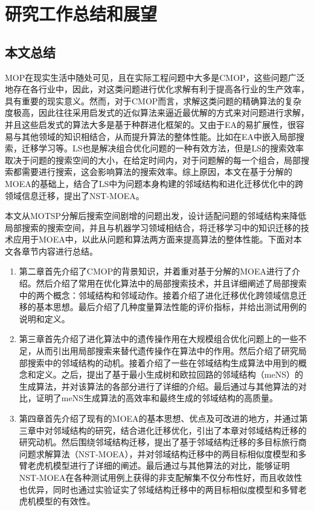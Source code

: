 \chapter{研究工作总结和展望}
\label{chap:conclusion}
\section{本文总结}
\label{sec:conclusion}
MOP在现实生活中随处可见，且在实际工程问题中大多是CMOP，这些问题广泛地存在各行业中，因此，对这类问题进行优化求解有利于提高各行业的生产效率，具有重要的现实意义。然而，对于CMOP而言，求解这类问题的精确算法的复杂度极高，因此往往采用启发式的近似算法来逼近最优解的方式来对问题进行求解，并且这些启发式的算法大多是基于种群进化框架的。又由于EA的易扩展性，很容易与其他领域的知识相结合，从而提升算法的整体性能。比如在EA中嵌入局部搜索，迁移学习等。LS也是解决组合优化问题的一种有效方法，但是LS的搜索效率取决于问题的搜索空间的大小，在给定时间内，对于问题解的每一个组合，局部搜索都需要进行搜索，这会影响算法的搜索效率。综上原因，本文在基于分解的MOEA的基础上，结合了LS中为问题本身构建的邻域结构和进化迁移优化中的跨领域信息迁移，提出了NST-MOEA。
\par
本文从MOTSP分解后搜索空间剧增的问题出发，设计适配问题的邻域结构来降低局部搜索的搜索空间，并且与机器学习领域相结合，将迁移学习中的知识迁移的技术应用于MOEA中，以此从问题和算法两方面来提高算法的整体性能。下面对本文各章节内容进行总结。
\begin{enumerate}
    \item 第二章首先介绍了CMOP的背景知识，并着重对基于分解的MOEA进行了介绍。然后介绍了常用在优化算法中的局部搜索技术，并且详细阐述了局部搜索中的两个概念：邻域结构和邻域动作。接着介绍了进化迁移优化跨领域信息迁移的基本思想。最后介绍了几种度量算法性能的评价指标，并给出测试用例的说明和定义。
    \item 第三章首先介绍了进化算法中的遗传操作用在大规模组合优化问题上的一些不足，从而引出用局部搜索来替代遗传操作在算法中的作用。然后介绍了研究局部搜索中的邻域结构的动机。接着介绍了一些在邻域结构生成算法中用到的概念和定义。之后，提出了基于最小生成树和欧拉回路的邻域结构（meNS）的生成算法，并对该算法的各部分进行了详细的介绍。最后通过与其他算法的对比，证明了meNS生成算法的高效率和最终生成的邻域结构的高质量。
    \item 第四章首先介绍了现有的MOEA的基本思想、优点及可改进的地方，并通过第三章中对邻域结构的研究，结合进化迁移优化，引出了本章对邻域结构迁移的研究动机。然后围绕邻域结构迁移，提出了基于邻域结构迁移的多目标旅行商问题求解算法（NST-MOEA），并对邻域结构迁移中的两目标相似度模型和多臂老虎机模型进行了详细的阐述。最后通过与其他算法的对比，能够证明NST-MOEA在各种测试用例上获得的非支配解集不仅分布性好，而且收敛性也优异，同时也通过实验证实了邻域结构迁移中的两目标相似度模型和多臂老虎机模型的有效性。
\end{enumerate}

